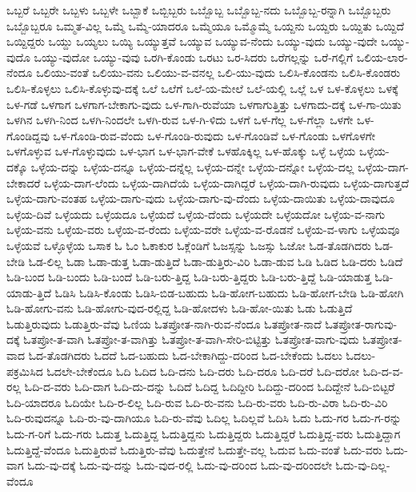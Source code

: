 {ಒಬ್ಬರೆ
ಒಬ್ಬರೇ
ಒಬ್ಬಳು
ಒಬ್ಬಳೇ
ಒಬ್ಬಾಕೆ
ಒಬ್ಬಿಬ್ಬರು
ಒಬ್ಬೊಬ್ಬ
ಒಬ್ಬೊಬ್ಬ-ನದು
ಒಬ್ಬೊಬ್ಬ-ರನ್ನಾಗಿ
ಒಬ್ಬೊಬ್ಬರು
ಒಬ್ಬೊಬ್ಬರೂ
ಒಮ್ಮತ-ವಿಲ್ಲ
ಒಮ್ಮೆ
ಒಮ್ಮೆ-ಯಾದರೂ
ಒಮ್ಮೆಯೂ
ಒಮ್ಮೊಮ್ಮೆ
ಒಯ್ದನು
ಒಯ್ದರು
ಒಯ್ದಿತು
ಒಯ್ದಿದೆ
ಒಯ್ದಿದ್ದರು
ಒಯ್ದು
ಒಯ್ಯಲು
ಒಯ್ಯಿ
ಒಯ್ಯುತ್ತವೆ
ಒಯ್ಯುವ
ಒಯ್ಯುವ-ನೆಂದು
ಒಯ್ಯು-ವುದು
ಒಯ್ಯು-ವುದೇ
ಒಯ್ಯು-ವುದೊ
ಒಯ್ಯು-ವುದೋ
ಒಯ್ಯು-ವುವು
ಒರಗಿ-ಕೊಂಡು
ಒರಟು
ಒರ-ಸಿದರು
ಒರೆಗಲ್ಲನ್ನು
ಒರೆ-ಗಲ್ಲಿಗೆ
ಒಲಿಯ-ಲಾರ-ನೆಂದೂ
ಒಲಿಯು-ವಂತೆ
ಒಲಿಯು-ವನು
ಒಲಿಯು-ವ-ವನಲ್ಲ
ಒಲಿ-ಯು-ವುದು
ಒಲಿಸಿ-ಕೊಂಡನು
ಒಲಿಸಿ-ಕೊಂಡರು
ಒಲಿಸಿ-ಕೊಳ್ಳಲು
ಒಲಿಸಿ-ಕೊಳ್ಳುವು-ದಕ್ಕೆ
ಒಲೆ
ಒಲೆಗೆ
ಒಲೆ-ಯ-ಮೇಲೆ
ಒಲೆ-ಯಲ್ಲಿ
ಒಲ್ಲೆ
ಒಳ
ಒಳ-ಕೊಳ್ಳಲು
ಒಳಕ್ಕೆ
ಒಳ-ಗಡೆ
ಒಳಗಾಗ
ಒಳಗಾಗ-ಬೇಕಾಗು-ವುದು
ಒಳ-ಗಾಗಿ-ರುವೆಯಾ
ಒಳಗಾಗುತ್ತಿತ್ತು
ಒಳಗಾದು-ದಕ್ಕೆ
ಒಳ-ಗಾ-ಯಿತು
ಒಳಗಿನ
ಒಳಗಿ-ನಿಂದ
ಒಳಗಿ-ನಿಂದಲೇ
ಒಳಗಿ-ರುವ
ಒಳ-ಗಿ-ಳಿದು
ಒಳಗೆ
ಒಳ-ಗೆಲ್ಲ
ಒಳ-ಗೆಲ್ಲಾ
ಒಳಗೇ
ಒಳ-ಗೊಂಡಿದ್ದವು
ಒಳ-ಗೊಂಡಿ-ರುವ-ವೆಂದು
ಒಳ-ಗೊಂಡಿ-ರುವುದು
ಒಳ-ಗೊಂಡಿವೆ
ಒಳ-ಗೊಂಡು
ಒಳಗೊಳಗೇ
ಒಳಗೊಳ್ಳುವ
ಒಳ-ಗೊಳ್ಳುವುದು
ಒಳ-ಭಾಗ
ಒಳ-ಭಾಗ-ವೇಕೆ
ಒಳಹೊಕ್ಕಿಲ್ಲ
ಒಳ-ಹೊಕ್ಕು
ಒಳ್ಳೆ
ಒಳ್ಳೆಯ
ಒಳ್ಳೆಯ-ದಕ್ಕೊ
ಒಳ್ಳೆಯ-ದನ್ನು
ಒಳ್ಳೆಯ-ದನ್ನೂ
ಒಳ್ಳೆಯ-ದನ್ನೆಲ್ಲ
ಒಳ್ಳೆಯ-ದನ್ನೇ
ಒಳ್ಳೆಯ-ದನ್ನೋ
ಒಳ್ಳೆಯ-ದಲ್ಲ
ಒಳ್ಳೆಯ-ದಾಗ-ಬೇಕಾದರೆ
ಒಳ್ಳೆಯ-ದಾಗ-ಲೆಂದು
ಒಳ್ಳೆಯ-ದಾಗಿದೆಯೆ
ಒಳ್ಳೆಯ-ದಾಗಿದ್ದರೆ
ಒಳ್ಳೆಯ-ದಾಗಿ-ರುವುದು
ಒಳ್ಳೆಯ-ದಾಗುತ್ತದೆ
ಒಳ್ಳೆಯ-ದಾಗು-ವಂತಹ
ಒಳ್ಳೆಯ-ದಾಗು-ವುದು
ಒಳ್ಳೆಯ-ದಾಗು-ವು-ದೆಂದು
ಒಳ್ಳೆಯ-ದಾಯಿತು
ಒಳ್ಳೆಯ-ದಾವುದೂ
ಒಳ್ಳೆಯ-ದಿವೆ
ಒಳ್ಳೆಯದು
ಒಳ್ಳೆಯದೂ
ಒಳ್ಳೆಯದೆ
ಒಳ್ಳೆಯ-ದೆಂದು
ಒಳ್ಳೆಯದೇ
ಒಳ್ಳೆಯದೋ
ಒಳ್ಳೆಯ-ವ-ನಾಗು
ಒಳ್ಳೆಯ-ವನು
ಒಳ್ಳೆಯ-ವರು
ಒಳ್ಳೆಯ-ವ-ರೆಂದು
ಒಳ್ಳೆಯ-ವರೇ
ಒಳ್ಳೆಯ-ವ-ರೊಡನೆ
ಒಳ್ಳೆಯ-ವ-ಳಾಗು
ಒಳ್ಳೆಯವೂ
ಒಳ್ಳೆಯವೆ
ಒಳ್ಳೊಳ್ಳೆಯ
ಒಸಾಕ
ಓ
ಓಂ
ಓಕಾಕುರ
ಓಕ್ಲೆಂಡಿಗೆ
ಓಜಸ್ಸನ್ನು
ಓಜಸ್ಸು
ಓಜೋ
ಓಡ-ತೊಡಗಿದರು
ಓಡ-ಬೇಡಿ
ಓಡ-ಲಿಲ್ಲ
ಓಡಾ
ಓಡಾ-ಡುತ್ತ
ಓಡಾ-ಡುತ್ತಿದೆ
ಓಡಾ-ಡುತ್ತಿರು-ವಿರಿ
ಓಡಾ-ಡುವ
ಓಡಿ
ಓಡಿದ
ಓಡಿ-ದರು
ಓಡಿದೆ
ಓಡಿ-ಬಂದ
ಓಡಿ-ಬಂದು
ಓಡಿ-ಬಂದೆ
ಓಡಿ-ಬರು-ತ್ತಿದ್ದ
ಓಡಿ-ಬರು-ತ್ತಿದ್ದರು
ಓಡಿ-ಬರು-ತ್ತಿದ್ದೆ
ಓಡಿ-ಯಾಡುತ್ತ
ಓಡಿ-ಯಾಡು-ತ್ತಿದೆ
ಓಡಿಸಿ
ಓಡಿಸಿ-ಕೊಂಡು
ಓಡಿಸಿ-ಬಿಡ-ಬಹುದು
ಓಡಿ-ಹೋಗ-ಬಹುದು
ಓಡಿ-ಹೋಗ-ಬೇಡಿ
ಓಡಿ-ಹೋಗಿ
ಓಡಿ-ಹೋಗು-ವನು
ಓಡಿ-ಹೋಗು-ವುದ-ರಲ್ಲಿದ್ದ
ಓಡಿ-ಹೋದಳು
ಓಡಿ-ಹೋ-ಯಿತು
ಓಡು
ಓಡುತ್ತಿದೆ
ಓಡುತ್ತಿರುವುದು
ಓಡುತ್ತಿರು-ವೆವು
ಓಣಿಯ
ಓತಪ್ರೋತ-ನಾಗಿ-ರುವ-ನೆಂದೂ
ಓತಪ್ರೋತ-ನಾದೆ
ಓತಪ್ರೋತ-ರಾಗುವು-ದಕ್ಕೆ
ಓತಪ್ರೋ-ತ-ವಾಗಿ
ಓತಪ್ರೋ-ತ-ವಾಗಿತ್ತು
ಓತಪ್ರೋ-ತ-ವಾಗಿ-ಸೇರಿ-ಬಿಟ್ಟಿತ್ತು
ಓತಪ್ರೋತ-ವಾಗು-ವುದು
ಓತಪ್ರೋತ-ವಾದ
ಓದ-ತೊಡಗಿದರು
ಓದದೆ
ಓದ-ಬಹುದು
ಓದ-ಬೇಕಾಗಿದ್ದು-ದರಿಂದ
ಓದ-ಬೇಕೆಂದು
ಓದಲು
ಓದಲು-ಪಕ್ರಮಿಸಿದ
ಓದಲೇ-ಬೇಕೆಂದೂ
ಓದಿ
ಓದಿದ
ಓದಿ-ದನು
ಓದಿ-ದರು
ಓದಿ-ದರೂ
ಓದಿ-ದರೆ
ಓದಿ-ದರೋ
ಓದಿ-ದ-ವ-ರಲ್ಲ
ಓದಿ-ದ-ವರು
ಓದಿ-ದಾಗ
ಓದಿ-ದು-ದನ್ನು
ಓದಿದೆ
ಓದಿದ್ದ
ಓದಿದ್ದೀರಿ
ಓದಿದ್ದು-ದರಿಂದ
ಓದಿದ್ದೇನೆ
ಓದಿ-ಬಿಟ್ಟರೆ
ಓದಿ-ಯಾದರೂ
ಓದಿಯೇ
ಓದಿ-ರ-ಲಿಲ್ಲ
ಓದಿ-ರುವ
ಓದಿ-ರು-ವನು
ಓದಿ-ರು-ವರು
ಓದಿ-ರು-ವಿರಾ
ಓದಿ-ರು-ವಿರಿ
ಓದಿ-ರುವುದನ್ನೂ
ಓದಿ-ರು-ವು-ದಾಗಿಯೂ
ಓದಿ-ರು-ವೆವು
ಓದಿಲ್ಲ
ಓದಿಲ್ಲವೆ
ಓದಿಸಿ
ಓದು
ಓದು-ಗರ
ಓದು-ಗ-ರನ್ನು
ಓದು-ಗ-ರಿಗೆ
ಓದು-ಗರು
ಓದುತ್ತ
ಓದುತ್ತಿದ್ದ
ಓದುತ್ತಿದ್ದನು
ಓದುತ್ತಿದ್ದರು
ಓದುತ್ತಿದ್ದರೆ
ಓದುತ್ತಿದ್ದ-ವರು
ಓದುತ್ತಿದ್ದಾಗ
ಓದುತ್ತಿದ್ದೆ-ವೆಂದೂ
ಓದುತ್ತಿರುವೆ
ಓದುತ್ತಿರು-ವೆವು
ಓದುತ್ತೇನೆ
ಓದುತ್ತೇ-ವಲ್ಲ
ಓದುವ
ಓದು-ವಂತೆ
ಓದು-ವರು
ಓದು-ವಾಗ
ಓದು-ವು-ದಕ್ಕೆ
ಓದು-ವು-ದನ್ನು
ಓದು-ವುದ-ರಲ್ಲಿ
ಓದು-ವು-ದರಿಂದ
ಓದು-ವು-ದರಿಂದಲೇ
ಓದು-ವು-ದಿಲ್ಲ-ವೆಂದೂ
}
